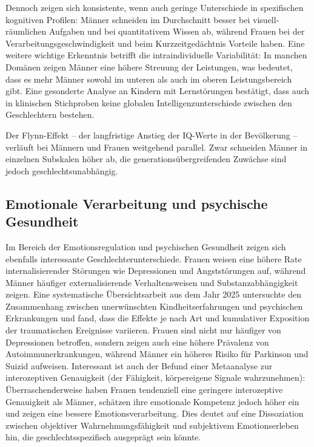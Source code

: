 \documentclass[12pt,a4paper]{article}
\begin{document}
	Dennoch zeigen sich konsistente, wenn auch geringe Unterschiede in spezifischen kognitiven Profilen: Männer schneiden im Durchschnitt besser bei visuell-räumlichen Aufgaben und bei quantitativem Wissen ab, während Frauen bei der Verarbeitungsgeschwindigkeit und beim Kurzzeitgedächtnis Vorteile haben. Eine weitere wichtige Erkenntnis betrifft die intraindividuelle Variabilität: In manchen Domänen zeigen Männer eine höhere Streuung der Leistungen, was bedeutet, dass es mehr Männer sowohl im unteren als auch im oberen Leistungsbereich gibt. \cite{Giofre2024} Eine gesonderte Analyse an Kindern mit Lernstörungen bestätigt, dass auch in klinischen Stichproben keine globalen Intelligenzunterschiede zwischen den Geschlechtern bestehen. \cite{Toffalini2025}
	
	Der Flynn-Effekt – der langfristige Anstieg der IQ-Werte in der Bevölkerung – verläuft bei Männern und Frauen weitgehend parallel. Zwar schneiden Männer in einzelnen Subskalen höher ab, die generationsübergreifenden Zuwächse sind jedoch geschlechtsunabhängig. \cite{Gnambs2011}
	
	\subsection{Emotionale Verarbeitung und psychische Gesundheit}
	Im Bereich der Emotionsregulation und psychischen Gesundheit zeigen sich ebenfalls interessante Geschlechterunterschiede. Frauen weisen eine höhere Rate internalisierender Störungen wie Depressionen und Angststörungen auf, während Männer häufiger externalisierende Verhaltensweisen und Substanzabhängigkeit zeigen. Eine systematische Übersichtsarbeit aus dem Jahr 2025 untersuchte den Zusammenhang zwischen unerwünschten Kindheitserfahrungen und psychischen Erkrankungen und fand, dass die Effekte je nach Art und kumulativer Exposition der traumatischen Ereignisse variieren. \cite{PsychMeta2025} Frauen sind nicht nur häufiger von Depressionen betroffen, sondern zeigen auch eine höhere Prävalenz von Autoimmunerkrankungen, während Männer ein höheres Risiko für Parkinson und Suizid aufweisen. \cite{KISpotlight}
	Interessant ist auch der Befund einer Metaanalyse zur interozeptiven Genauigkeit (der Fähigkeit, körpereigene Signale wahrzunehmen): Überraschenderweise haben Frauen tendenziell eine geringere interozeptive Genauigkeit als Männer, schätzen ihre emotionale Kompetenz jedoch höher ein und zeigen eine bessere Emotionsverarbeitung. \cite{ScienceDirect2025} Dies deutet auf eine Dissoziation zwischen objektiver Wahrnehmungsfähigkeit und subjektivem Emotionserleben hin, die geschlechtsspezifisch ausgeprägt sein könnte.
	
\end{document}
